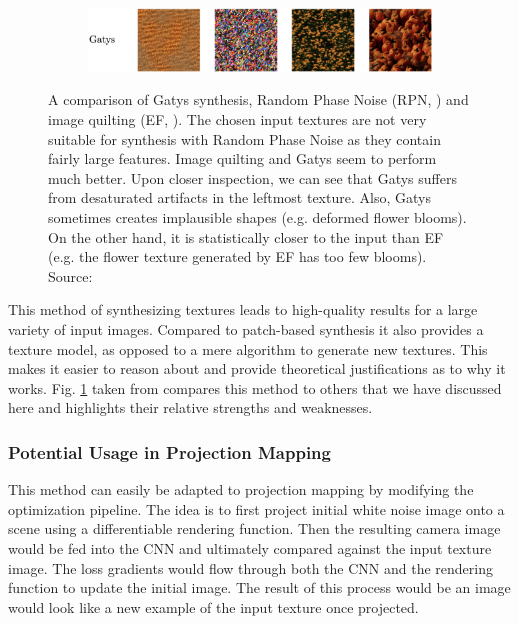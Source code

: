 \begin{figure}[ht]
    \begin{subfigure}[b]{\textwidth}
        \centering
        \includegraphics[width=\textwidth]{images/02-big_comparison_gatys_compressed.jpg}
        \caption*{}
    \end{subfigure}
    \caption{A comparison of Gatys synthesis, Random Phase Noise (RPN, \citet{Galerne2011}) and image quilting (EF, \citet{Efros2001}). The chosen input textures are not very suitable for synthesis with Random Phase Noise as they contain fairly large features. Image quilting and Gatys seem to perform much better. Upon closer inspection, we can see that Gatys suffers from desaturated artifacts in the leftmost texture. Also, Gatys sometimes creates implausible shapes (e.g. deformed flower blooms). On the other hand, it is statistically closer to the input than EF (e.g. the flower texture generated by EF has too few blooms). Source: \citet{Raad2018}}
    \label{fig:background_synthesis_comparison}
\end{figure}

This method of synthesizing textures leads to high-quality results for a large variety of input images. Compared to patch-based synthesis it also provides a texture model, as opposed to a mere algorithm to generate new textures. This makes it easier to reason about and provide theoretical justifications as to why it works. Fig. \ref{fig:background_synthesis_comparison} taken from \citet{Raad2018} compares this method to others that we have discussed here and highlights their relative strengths and weaknesses.

\subsubsection{Potential Usage in Projection Mapping}
\label{section:background-texture_synthesis-statistics_based-projection_mapping}

This method can easily be adapted to projection mapping by modifying the optimization pipeline. The idea is to first project initial white noise image onto a scene using a differentiable rendering function. Then the resulting camera image would be fed into the CNN and ultimately compared against the input texture image. The loss gradients would flow through both the CNN and the rendering function to update the initial image. The result of this process would be an image would look like a new example of the input texture once projected.